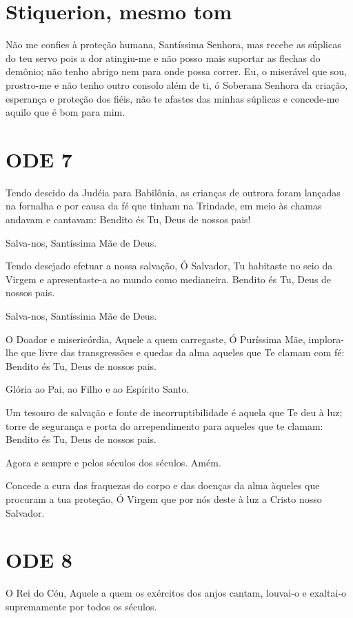 \documentclass{subfiles}
\begin{document}
\section{Stiquerion, mesmo tom}

Não me confies à proteção humana, Santíssima Senhora, mas recebe
as súplicas do teu servo pois a dor atingiu-me e não posso mais suportar as
flechas do demônio; não tenho abrigo nem para onde possa correr. Eu, o
miserável que sou, prostro-me e não tenho outro consolo além de ti, ó
Soberana Senhora da criação, esperança e proteção dos fiéis, não te afastes
das minhas súplicas e concede-me aquilo que é bom para mim.

\section{ODE 7}

\eirmos{}Tendo descido da Judéia para Babilônia, as crianças de outrora
foram lançadas na fornalha e por causa da fé que tinham na Trindade, em meio
às chamas andavam e cantavam: Bendito és Tu, Deus de nossos pais!

Salva-nos, Santíssima Mãe de Deus.

Tendo desejado efetuar a nossa salvação, Ó Salvador, Tu habitaste no
seio da Virgem e apresentaste-a ao mundo como medianeira. Bendito és Tu,
Deus de nossos pais.

Salva-nos, Santíssima Mãe de Deus.

O Doador e misericórdia, Aquele a quem carregaste, Ó Puríssima Mãe,
implora-lhe que livre das transgressões e quedas da alma aqueles que Te
clamam com fé: Bendito és Tu, Deus de nossos pais.

Glória ao Pai, ao Filho e ao Espírito Santo.

Um tesouro de salvação e fonte de incorruptibilidade é aquela que Te
deu à luz; torre de segurança e porta do arrependimento para aqueles que te
clamam: Bendito és Tu, Deus de nossos pais.

Agora e sempre e pelos séculos dos séculos. Amém.

Concede a cura das fraquezas do corpo e das doenças da alma àqueles
que procuram a tua proteção, Ó Virgem que por nós deste à luz a Cristo nosso
Salvador.

\section{ODE 8}

\eirmos{}O Rei do Céu, Aquele a quem os exércitos dos anjos cantam,
louvai-o e exaltai-o supremamente por todos os séculos.
\end{document}
